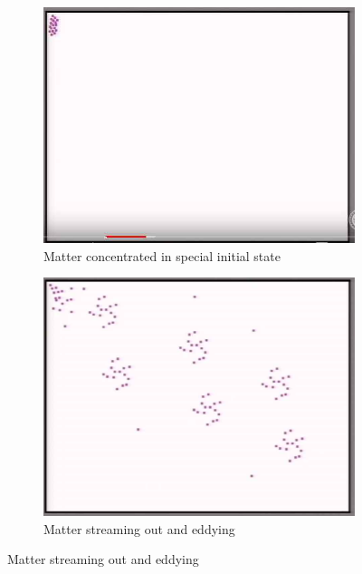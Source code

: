 \documentclass[]{article}
\begin{document}
\begin{figure}[H]
	\begin{center}
		\caption{Matter evolving from initial configuration}
		\begin{subfigure}[b]{0.3\textwidth}
			\caption{Matter concentrated in special initial state}\label{fig:bolztmann-start}
			\includegraphics[width=\textwidth]{bolztmann-start}
		\end{subfigure}
		\;
		\begin{subfigure}[b]{0.3\textwidth}
			\caption{Matter streaming out and eddying}\label{fig:one_way_street-Boltzmann}
			\includegraphics[width=\textwidth]{one_way_street-Boltzmann}
		\end{subfigure}

\end{center}
\end{figure}
\end{document}

